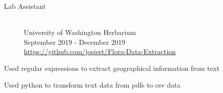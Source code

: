 \documentclass[10pt]{article}
\newenvironment{itemize*}
{\begin{itemize}[leftmargin=*]
    \setlength{\parskip}{0.5pt}}
{\end{itemize}}
\begin{document}
\begin{paracol}{2}
\begin{description}
\item[Lab Assistant] \hfill \\
    University of Washington Herbarium\\
    September 2019 - December 2019\\
    \url{https://github.com/josiest/Flora-Data-Extraction}
\end{description}
\begin{itemize*}
\item Used regular expressions to extract geographical information from text
\item Used python to transform text data from pdfs to csv data
\end{itemize*}

\end{paracol}
\end{document}
